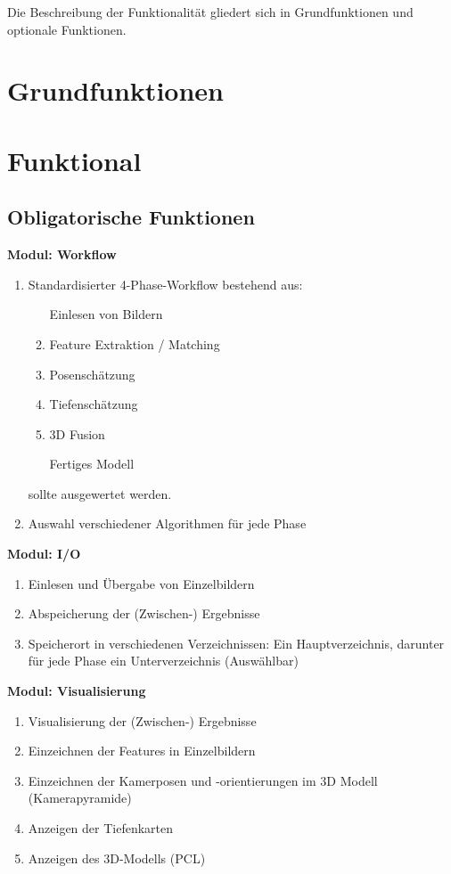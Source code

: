 
Die Beschreibung der Funktionalität gliedert sich in Grundfunktionen und optionale Funktionen.

\section{Grundfunktionen}
\section{Funktional}
\subsection{Obligatorische Funktionen}
\textbf{Modul: Workflow}
\begin{enumerate}[ align=left, label={\textbf{\textbackslash FM1\arabic*0\textbackslash}} ]
	\item Standardisierter 4-Phase-Workflow bestehend aus:
\begin{enumerate}[ align=left, label={\textbf{\arabic*}} ]
	\item [Einlesen von Bildern]
	\item Feature Extraktion / Matching
	\item Posenschätzung
	\item Tiefenschätzung
	\item 3D Fusion
	\item [Fertiges Modell]
	\end{enumerate}
	sollte ausgewertet werden.
	\item Auswahl verschiedener Algorithmen für jede Phase
\end{enumerate}
\textbf{Modul: I/O}
\begin{enumerate}[ align=left, label={\textbf{\textbackslash FM2\arabic*0\textbackslash}} ]
	\item Einlesen und Übergabe von Einzelbildern
	\item Abspeicherung der (Zwischen-) Ergebnisse
	\item Speicherort in verschiedenen Verzeichnissen: Ein Hauptverzeichnis, darunter für jede Phase
	ein Unterverzeichnis (Auswählbar)
\end{enumerate}
\textbf{Modul: Visualisierung}
\begin{enumerate}[ align=left, label={\textbf{\textbackslash FM3\arabic*0\textbackslash}} ]
	\item Visualisierung der (Zwischen-) Ergebnisse
	\item Einzeichnen der Features in Einzelbildern
	\item Einzeichnen der Kamerposen und -orientierungen im 3D Modell (Kamerapyramide)
	\item Anzeigen der Tiefenkarten
	\item Anzeigen des 3D-Modells (PCL)
\end{enumerate}
